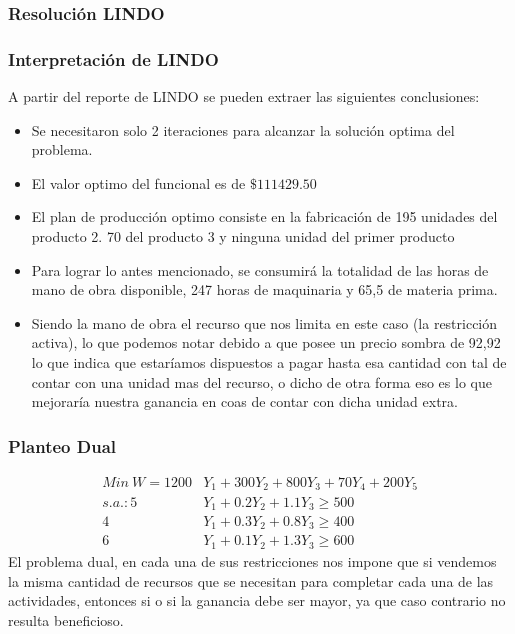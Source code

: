 \begin{homeworkProblem}[-1][Empresita]
\subsubsection{Resolución LINDO}
\subsubsection{Interpretación de LINDO}
A partir del reporte de LINDO se pueden extraer las siguientes conclusiones: 
\begin{itemize}
    \item Se necesitaron solo 2 iteraciones para alcanzar la solución optima del problema.
    \item El valor optimo del funcional es de $\$111429.50$
    \item El plan de producción optimo consiste en la fabricación de 195 unidades del producto 2. 70 del producto 3 y ninguna unidad del primer producto
    \item Para lograr lo antes mencionado, se consumirá la totalidad de las horas de mano de obra disponible, 247 horas de maquinaria y 65,5 de materia prima.
    \item Siendo la mano de obra el recurso que nos limita en este caso (la restricción activa), lo que podemos notar debido a que posee un precio sombra de 92,92 lo que indica que estaríamos dispuestos a pagar hasta esa cantidad con tal de contar con una unidad mas del recurso, o dicho de otra forma eso es lo que mejoraría nuestra ganancia en coas de contar con dicha unidad extra.
\end{itemize}

\subsubsection{Planteo Dual}
\begin{align*}
    Min\ W = 1200&Y_1 + 300Y_2 + 800Y_3 + 70Y_4 + 200Y_5 \\
    s.a.:5&Y_1 + 0.2Y_2 + 1.1Y_3 \ge 500 \\
    4&Y_1 + 0.3Y_2 + 0.8Y_3 \ge 400 \\
    6&Y_1 + 0.1Y_2 + 1.3Y_3 \ge 600
\end{align*}
El problema dual, en cada una de sus restricciones nos impone que si vendemos la misma cantidad de recursos que se necesitan para completar cada una de las actividades, entonces si o si la ganancia debe ser mayor, ya que caso contrario no resulta beneficioso.
\end{homeworkProblem} 